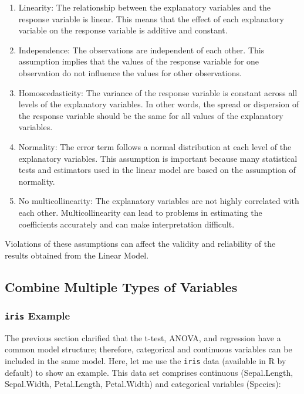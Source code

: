 \documentclass[
]{article}
\begin{document}
\begin{enumerate}
\def\labelenumi{\arabic{enumi}.}
\item
  Linearity: The relationship between the explanatory variables and the response variable is linear. This means that the effect of each explanatory variable on the response variable is additive and constant.
\item
  Independence: The observations are independent of each other. This assumption implies that the values of the response variable for one observation do not influence the values for other observations.
\item
  Homoscedasticity: The variance of the response variable is constant across all levels of the explanatory variables. In other words, the spread or dispersion of the response variable should be the same for all values of the explanatory variables.
\item
  Normality: The error term follows a normal distribution at each level of the explanatory variables. This assumption is important because many statistical tests and estimators used in the linear model are based on the assumption of normality.
\item
  No multicollinearity: The explanatory variables are not highly correlated with each other. Multicollinearity can lead to problems in estimating the coefficients accurately and can make interpretation difficult.
\end{enumerate}

Violations of these assumptions can affect the validity and reliability of the results obtained from the Linear Model.

\hypertarget{combine-multiple-types-of-variables}{%
\subsection{Combine Multiple Types of Variables}\label{combine-multiple-types-of-variables}}

\hypertarget{iris-example}{%
\subsubsection{\texorpdfstring{\texttt{iris} Example}{iris Example}}\label{iris-example}}

The previous section clarified that the t-test, ANOVA, and regression have a common model structure; therefore, categorical and continuous variables can be included in the same model. Here, let me use the \texttt{iris} data (available in R by default) to show an example. This data set comprises continuous (Sepal.Length, Sepal.Width, Petal.Length, Petal.Width) and categorical variables (Species):
\end{document}
